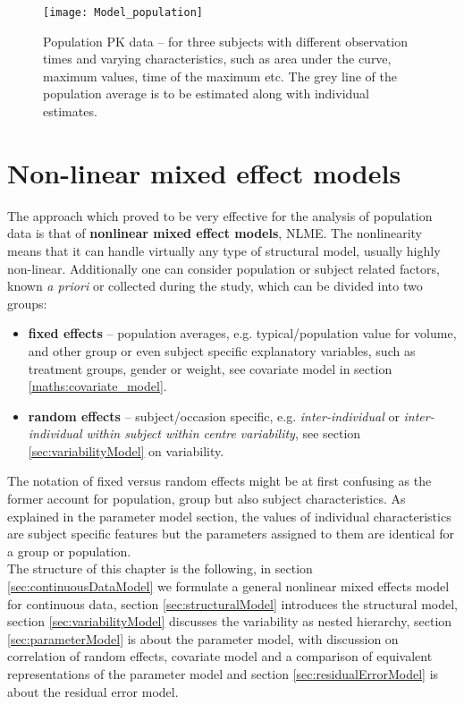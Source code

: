 \begin{figure}[htbp]
\centering
 \texttt{[image: Model\_population]}
\caption{Population PK data --  for three subjects with different observation times and varying characteristics, such as area under the curve, maximum values, time of the maximum etc. The grey line of the population average is to be estimated along with individual estimates.}
\label{fig:popModel}
\end{figure}

\section{Non-linear mixed effect models}

The approach which proved to be very effective for the analysis of population data is that of \textbf{nonlinear mixed effect models}, NLME. The nonlinearity means that it can handle virtually any type of structural model, usually highly non-linear. Additionally one can consider population or subject related factors, known \emph{a priori} or collected during the study, which can be divided into two groups:
\begin{itemize}
\item
\textbf{fixed effects} -- population averages, e.g. typical/population value for volume, and other group or even subject specific explanatory variables, such as treatment groups, gender or weight, see covariate model in section \ref{maths:covariate_model}.
\item
\textbf{random effects} -- subject/occasion specific, e.g. \textit{inter-individual} or \textit{inter-individual within subject within centre variability}, see section \ref{sec:variabilityModel} on variability.
\end{itemize}
The notation of fixed versus random effects might be at first confusing as the former account for population, group but also subject characteristics. As explained in the parameter model section, the values of individual characteristics are subject specific features but the parameters assigned to them are identical for a group or population. \\
The structure of this chapter is the following, in section \ref{sec:continuousDataModel} we formulate a general nonlinear mixed effects model for continuous data, section \ref{sec:structuralModel} introduces the structural model, section \ref{sec:variabilityModel} discusses the variability as nested hierarchy, section \ref{sec:parameterModel} is about the parameter model, with discussion on correlation of random effects, covariate model and a comparison of equivalent representations of the parameter model and section \ref{sec:residualErrorModel} is about the residual error model. 


